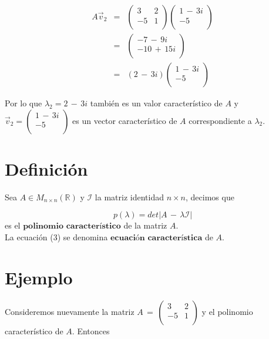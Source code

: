\documentclass[12pt]{article}
\newcommand{\definicion}{\section{Definición}}
\newcommand{\ejemplo}{\section{Ejemplo}}
\begin{document}
\begin{eqnarray*}
A \vec{v}_{2}& = & \begin{pmatrix}
            3 & 2 \\
            -5 & 1 \\
            \end{pmatrix} \begin{pmatrix}
            1 \, - \, 3i \\
            -5  \\
            \end{pmatrix} \\[0.2 cm]
& = & \begin{pmatrix}
            -7 \, - \, 9i \\
            -10 \, + \, 15i\\
            \end{pmatrix} \\[0.2 cm]
& = & (2 \, - \, 3i) \begin{pmatrix}
            1 \, - \, 3i \\
            -5  \\
            \end{pmatrix}
\end{eqnarray*}

Por lo que $\lambda _{2} = 2 \, - \, 3i $ también es un valor característico de $A$ y $\vec{v}_{2} = \begin{pmatrix}
            1 \, - \, 3i \\
            -5  \\
            \end{pmatrix}$ es un vector característico de $A$ correspondiente a  $\lambda_{2}.$
	
    
    \definicion
    
    Sea $ A \in M_{n \times n} (\mathbb{R})$ y $\mathscr{I} $ la matriz identidad $n \times n$, decimos que 

    \begin{equation}
        p(\lambda) = det| A \, - \, \lambda \mathscr{I}|
    \end{equation}
    es el $\textbf{polinomio característico}$ de la matriz $A$. \\ 
    
    La ecuación (3) se denomina $\textbf{ecuación característica}$ de $A$.
    
    \pagebreak
    
    \ejemplo
    
    Consideremos nuevamente la matriz $A \, = \, \begin{pmatrix}
            3 & 2 \\
            -5 & 1 \\
            \end{pmatrix} $ y el polinomio característico de $A$. Entonces 
            
\end{document}
